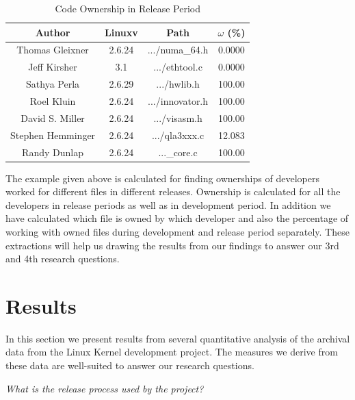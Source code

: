 \documentclass{acm_proc_article-sp}
\begin{document}
\begin{table}[ht]
\caption{Code Ownership in Release Period}  %
\centering 						%
\begin{tabular}{c c c c}				%
\hline\hline						%
Author 				& Linuxv		& Path				& $\omega$ (\%) \\ [0.5ex]
\hline 							%
Thomas Gleixner		& 2.6.24		& .../numa\_64.h	& 0.0000\\
Jeff Kirsher			& 3.1		& .../ethtool.c		& 0.0000\\
Sathya Perla			& 2.6.29		& .../hwlib.h		& 100.00\\
Roel Kluin			& 2.6.24		& .../innovator.h 	& 100.00\\
David S. Miller		& 2.6.24		& .../visasm.h 		& 100.00\\
Stephen Hemminger	& 2.6.24		& .../qla3xxx.c	 	& 12.083\\
Randy Dunlap			& 2.6.24		& ...\_core.c 		& 100.00\\
[1ex]							%
\hline 							%
\end{tabular}
\label{table:nonlin} 				%
\end{table}
The example given above is calculated for finding ownerships of developers worked for different files in different releases. Ownership is calculated for all the developers in release periods as well as in development period. In addition we have calculated which file is owned by which developer and also the percentage of working with owned files during development and release period separately. These extractions will help us drawing the results from our findings to answer our 3rd and 4th research questions.

\section{Results}
In this section we present results from several quantitative analysis of the archival data from the Linux Kernel development project. The measures we derive from these data are well-suited to answer our research questions.

\textit{What is the release process used by the project?}
\end{document}
